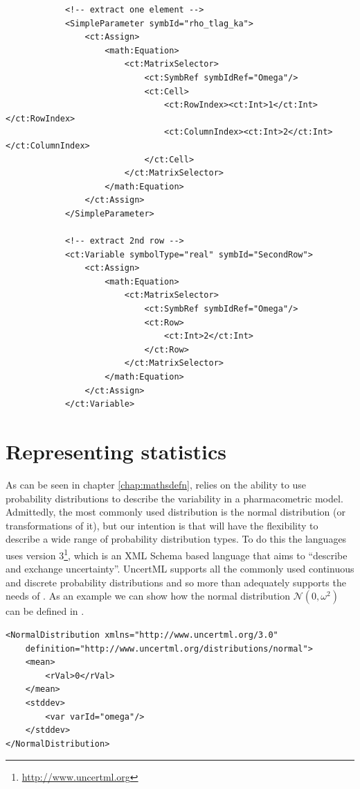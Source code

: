 \lstset{language=XML}
\begin{lstlisting}
            <!-- extract one element -->
            <SimpleParameter symbId="rho_tlag_ka">
                <ct:Assign>
                    <math:Equation>
                        <ct:MatrixSelector>
                            <ct:SymbRef symbIdRef="Omega"/>
                            <ct:Cell>
                                <ct:RowIndex><ct:Int>1</ct:Int></ct:RowIndex>
                                <ct:ColumnIndex><ct:Int>2</ct:Int></ct:ColumnIndex>
                            </ct:Cell>
                        </ct:MatrixSelector>
                    </math:Equation>
                </ct:Assign>
            </SimpleParameter>
            
            <!-- extract 2nd row -->
            <ct:Variable symbolType="real" symbId="SecondRow">
                <ct:Assign>
                    <math:Equation>
                        <ct:MatrixSelector>
                            <ct:SymbRef symbIdRef="Omega"/>
                            <ct:Row>
                                <ct:Int>2</ct:Int>
                            </ct:Row>
                        </ct:MatrixSelector>
                    </math:Equation>
                </ct:Assign>
            </ct:Variable>
\end{lstlisting}


\section{Representing statistics}

As can be seen in chapter \ref{chap:mathsdefn}, \pharmml relies on the
ability to use probability distributions to describe the variability
in a pharmacometric model. Admittedly, the most commonly used
distribution is the normal distribution (or transformations of it),
but our intention is that \pharmml will have the flexibility to
describe a wide range of probability distribution types. To do this
the languages uses \uncertml version
3\footnote{\url{http://www.uncertml.org}}, which is an XML Schema
based language that aims to ``describe and exchange
uncertainty''. UncertML supports all the commonly used continuous and
discrete probability distributions and so more than adequately
supports the needs of \pharmml.  As an example we can show how the
normal distribution $\mathcal{N}(0, \omega^2)$ can be defined in
\uncertml.
\lstset{language=XML}
\begin{lstlisting}
<NormalDistribution xmlns="http://www.uncertml.org/3.0"
    definition="http://www.uncertml.org/distributions/normal">
    <mean>
        <rVal>0</rVal>
    </mean>
    <stddev>
        <var varId="omega"/>
    </stddev>
</NormalDistribution>
\end{lstlisting}

